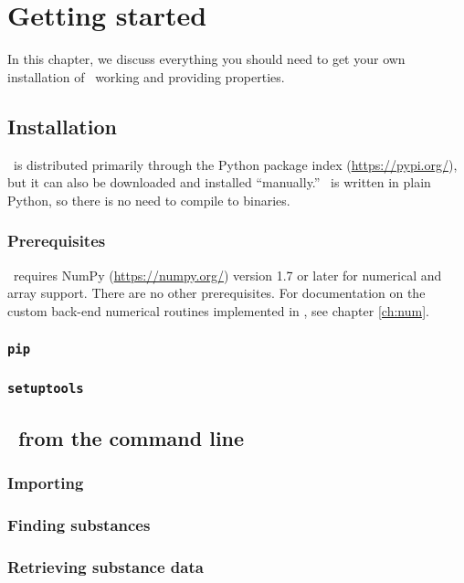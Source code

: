 \chapter{Getting started}\label{ch:start}

In this chapter, we discuss everything you should need to get your own installation of \PM\ working and providing properties.

\section{Installation}

\PM\ is distributed primarily through the Python package index (\url{https://pypi.org/}), but it can also be downloaded and installed ``manually.''  \PM\ is written in plain Python, so there is no need to compile to binaries.

\subsection{Prerequisites}

\PM\ requires NumPy (\url{https://numpy.org/}) version 1.7 or later for numerical and array support.  There are no other prerequisites.  For documentation on the custom back-end numerical routines implemented in \PM, see chapter \ref{ch:num}.

\subsection{\texttt{pip}}

\subsection{\texttt{setuptools}}


\section{\PM\ from the command line}

\subsection{Importing}

\subsection{Finding substances}

\subsection{Retrieving substance data}


